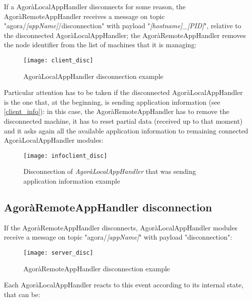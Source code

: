 If a AgoràLocalAppHandler disconnects for some reason, the AgoràRemoteAppHandler receives a message on topic "agora\slash{}\textit{[appName]}\slash{}disconnection" with payload "\textit{[hostname]\_[PID]}", relative to the disconnected AgoràLocalAppHandler; the AgoràRemoteAppHandler removes the node identifier from the list of machines that it is managing:

\begin{figure}[H]

    \centering
    \texttt{[image: client\_disc]}
    \caption{AgoràLocalAppHandler disconnection example}
    
\end{figure}

Particular attention has to be taken if the disconnected AgoràLocalAppHandler is the one that, at the beginning, is sending application information (see \ref{client_info}): in this case, the AgoràRemoteAppHandler has to remove the disconnected machine, it has to reset partial data (received up to that moment) and it asks again all the available application information to remaining connected AgoràLocalAppHandler modules:

\begin{figure}[H]

    \centering
    \texttt{[image: infoclient\_disc]}
    \caption{Disconnection of \textit{AgoràLocalAppHandler} that was sending application information example}
    
\end{figure}





\subsection{AgoràRemoteAppHandler disconnection}\label{handler_disc}

If the AgoràRemoteAppHandler disconnects, AgoràLocalAppHandler modules receive a message on topic "agora\slash{}\textit{[appName]}" with payload "disconnection":

\begin{figure}[H]

    \centering
    \texttt{[image: server\_disc]}
    \caption{AgoràRemoteAppHandler disconnection example}
    
\end{figure}

Each AgoràLocalAppHandler reacts to this event according to its internal state, that can be:


